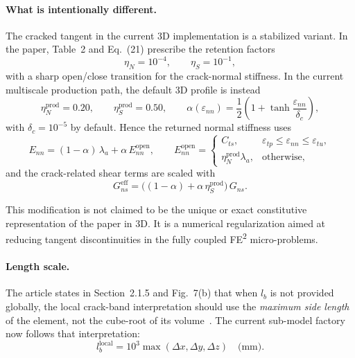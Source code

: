 \paragraph{What is intentionally different.}
The cracked tangent in the current 3D implementation is a stabilized variant.
In the paper, Table~2 and Eq.~(21) prescribe the retention factors
\begin{equation}
  \eta_N = 10^{-4},
  \qquad
  \eta_S = 10^{-1},
  \label{eq:kb-paper-retention-3d}
\end{equation}
with a sharp open/close transition for the crack-normal stiffness.  In the
current multiscale production path, the default 3D profile is instead
\begin{equation}
  \eta_N^{\mathrm{prod}} = 0.20,
  \qquad
  \eta_S^{\mathrm{prod}} = 0.50,
  \qquad
  \alpha(\varepsilon_{nn}) =
  \frac{1}{2}\left(1 + \tanh\frac{\varepsilon_{nn}}{\delta_c}\right),
  \label{eq:kb-3d-stabilized-retention}
\end{equation}
with \(\delta_c = 10^{-5}\) by default.  Hence the returned normal stiffness
uses
\begin{equation}
  E_{nn} =
  (1-\alpha)\,\lambda_a + \alpha\,E_{nn}^{\mathrm{open}},
  \qquad
  E_{nn}^{\mathrm{open}} =
  \begin{cases}
    C_{ts}, & \varepsilon_{tp} \le \varepsilon_{nn} \le \varepsilon_{tu},\\
    \eta_N^{\mathrm{prod}}\lambda_a, & \text{otherwise},
  \end{cases}
\end{equation}
and the crack-related shear terms are scaled with
\begin{equation}
  G_{ns}^{\mathrm{eff}}
  =
  \bigl((1-\alpha)+\alpha\,\eta_S^{\mathrm{prod}}\bigr)\,G_{ns}.
\end{equation}

This modification is not claimed to be the unique or exact constitutive
representation of the paper in 3D.  It is a numerical regularization aimed at
reducing tangent discontinuities in the fully coupled FE\textsuperscript{2}
micro-problems.

\paragraph{Length scale.}
The article states in Section~2.1.5 and Fig.~7(b) that when \(l_b\) is not
provided globally, the local crack-band interpretation should use the
\emph{maximum side length} of the element, not the cube-root of its
volume~\cite{KoBathe2026}.  The current sub-model factory now follows that
interpretation:
\begin{equation}
  l_b^{\mathrm{local}}
  =
  10^3 \max(\Delta x, \Delta y, \Delta z)
  \quad \text{(mm)}.
  \label{eq:kb-local-lb-max-side}
\end{equation}

